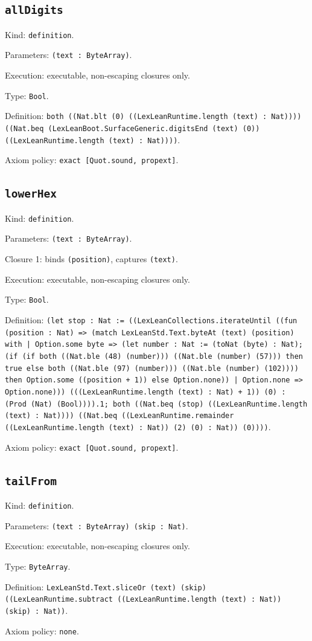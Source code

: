 \documentclass[11pt]{article}
\begin{document}
\subsection*{\texttt{allDigits}}
\noindent Kind: \texttt{definition}.\par
\noindent Parameters: \texttt{(text : ByteArray)}.\par
\noindent Execution: executable, non-escaping closures only.\par
\noindent Type: \texttt{Bool}.\par
\noindent Definition: \texttt{both ((Nat.blt (0) ((LexLeanRuntime.length (text) : Nat)))) ((Nat.beq (LexLeanBoot.SurfaceGeneric.digitsEnd (text) (0)) ((LexLeanRuntime.length (text) : Nat))))}.\par
\noindent Axiom policy: \texttt{exact [Quot.sound, propext]}.\par
\subsection*{\texttt{lowerHex}}
\noindent Kind: \texttt{definition}.\par
\noindent Parameters: \texttt{(text : ByteArray)}.\par
\noindent Closure 1: binds \texttt{(position)}, captures \texttt{(text)}.\par
\noindent Execution: executable, non-escaping closures only.\par
\noindent Type: \texttt{Bool}.\par
\noindent Definition: \texttt{(let stop : Nat := ((LexLeanCollections.iterateUntil ((fun (position : Nat) => (match LexLeanStd.Text.byteAt (text) (position) with | Option.some byte => (let number : Nat := (toNat (byte) : Nat); (if (if both ((Nat.ble (48) (number))) ((Nat.ble (number) (57))) then true else both ((Nat.ble (97) (number))) ((Nat.ble (number) (102)))) then Option.some ((position + 1)) else Option.none)) | Option.none => Option.none))) (((LexLeanRuntime.length (text) : Nat) + 1)) (0) : (Prod (Nat) (Bool)))).1; both ((Nat.beq (stop) ((LexLeanRuntime.length (text) : Nat)))) ((Nat.beq ((LexLeanRuntime.remainder ((LexLeanRuntime.length (text) : Nat)) (2) (0) : Nat)) (0))))}.\par
\noindent Axiom policy: \texttt{exact [Quot.sound, propext]}.\par
\subsection*{\texttt{tailFrom}}
\noindent Kind: \texttt{definition}.\par
\noindent Parameters: \texttt{(text : ByteArray) (skip : Nat)}.\par
\noindent Execution: executable, non-escaping closures only.\par
\noindent Type: \texttt{ByteArray}.\par
\noindent Definition: \texttt{LexLeanStd.Text.sliceOr (text) (skip) ((LexLeanRuntime.subtract ((LexLeanRuntime.length (text) : Nat)) (skip) : Nat))}.\par
\noindent Axiom policy: \texttt{none}.\par
\end{document}
